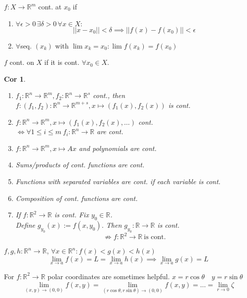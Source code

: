 \documentclass[a4paper, 10pt]{article}
\newtheorem*{corollary}{Cor}
\theoremstyle{definition}
\newcommand{\R}{\mathbb{R}}
\begin{document}
\begin{ntheorem*}[Continuity]
    \(f: X \to \R^m\) cont. at \(x_0\) if
    \begin{enumerate}
        \item \(\forall \epsilon > 0 \, \exists \delta > 0 \, \forall x \in X : \)
        \[||x-x_0|| < \delta \implies ||f(x) - f(x_0)|| < \epsilon\]
        \item \(\forall\)seq. \((x_k)\) with \(\lim x_k = x_0: \lim f(x_k) = f(x_0)\)
    \end{enumerate}
    \(f\) cont. on \(X\) if it is cont. \(\forall x_0 \in X\).
\end{ntheorem*}

\begin{corollary}
    \begin{enumerate}
        \item \(f_1: \R^n \to \R^m, f_2: \R^n \to \R^s\) cont., then \(f: (f_1, f_2): \R^n \to \R^{m + s}, x \mapsto (f_1(x), f_2(x))\) is cont.
        \item \(f: \R^n \to \R^m, x \mapsto (f_1(x), f_2(x), \ldots)\) cont.\\  \(\iff  \forall 1 \leq i \leq m \ f_i: \R^n \to \R\) are cont.
        \item \(f: \R^n \to \R^m, x \mapsto Ax\) and polynomials are cont.
        \item Sums/products of cont. functions are cont.
        \item Functions with separated variables are cont. if each variable is cont.
        \item Composition of cont. functions are cont.
        \item If \(f: \R^2 \to \R\) is cont. Fix \(y_0 \in \R\). \\ Define \(g_{y_0}(x) := f(x, y_0)\). Then \(g_{y_0}: \R \to \R\) is cont.
        \[\not\Rightarrow f: \R^2 \to \R \ \text{is cont.}\]
    \end{enumerate}
\end{corollary}

\begin{ntheorem*}
    \(f, g, h : \R^n \to \R\), \(\forall x \in \R^n: f(x) < g(x) < h(x)\)
    \[\lim_{x \to a} f(x) = L = \lim_{x \to a} h(x) \implies \lim_{x \to a}g(x) = L\]
\end{ntheorem*}

\begin{note*}
    For \(f: \R^2 \to \R\) polar coordinates are sometimes helpful.
    \(x = r \cos \theta \quad y = r \sin \theta\)
    \[\lim_{(x, y) \to (0, 0)}f(x, y) = \lim_{(r\cos\theta, r\sin\theta)  \to (0,0)}f(x, y) = \ldots = \lim_{r \to 0} \zeta\]
\end{note*}
\end{document}
